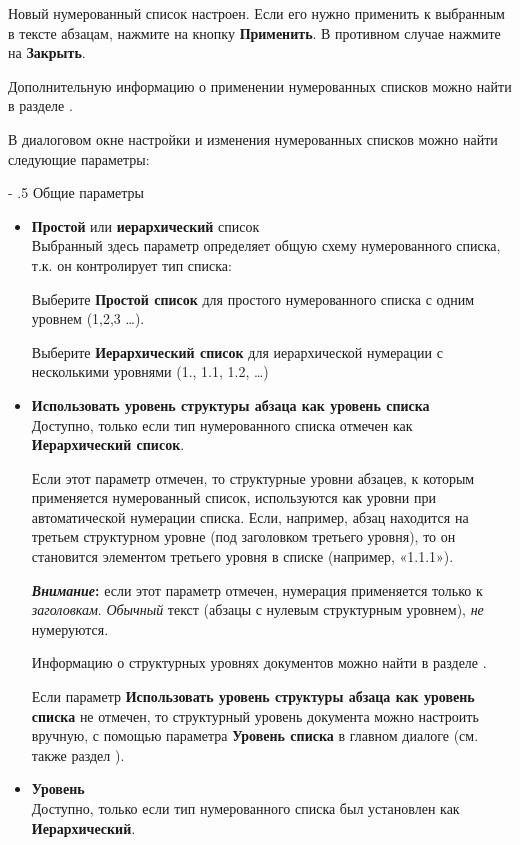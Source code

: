 ﻿\documentclass[a4paper,10pt]{article}
\makeatletter
\renewcommand\paragraph{%
   \@startsection{paragraph}{4}{0mm}%
      {-\baselineskip}%
      {.5\baselineskip}%
      {\normalfont\normalsize\bfseries}}
\makeatother
\begin{document}
Новый нумерованный список настроен. Если его нужно применить к выбранным в тексте абзацам, нажмите на кнопку \textbf{Применить}. В противном случае нажмите на \textbf{Закрыть}.

Дополнительную информацию о применении нумерованных списков можно найти в разделе .

В диалоговом окне настройки и изменения нумерованных списков можно найти следующие параметры:

\paragraph{Общие параметры}

\begin{itemize}
 \item \textbf{Простой} или \textbf{иерархический} список\\
 Выбранный здесь параметр определяет общую схему нумерованного списка, т.к. он контролирует тип списка:
 
 Выберите \textbf{Простой список} для простого нумерованного списка с одним уровнем (1,2,3 …).
 
 Выберите \textbf{Иерархический список} для иерархической нумерации с несколькими уровнями (1., 1.1, 1.2, …)
 \item \textbf{Использовать уровень структуры абзаца как уровень списка}\\
 Доступно, только если тип нумерованного списка отмечен как \textbf{Иерархический список}.
 
 Если этот параметр отмечен, то структурные уровни абзацев, к которым применяется нумерованный список, используются как уровни при автоматической нумерации списка. Если, например, абзац находится на третьем структурном уровне (под заголовком третьего уровня), то он становится элементом третьего уровня в списке (например, «1.1.1»).
 
 \begin{mdframed}[backgroundcolor=blue!10]
\textbf{\textit{Внимание}:} если этот параметр отмечен, нумерация применяется только к \textit{заголовкам}. \textit{Обычный} текст (абзацы с нулевым структурным уровнем), \textit{не} нумеруются.
\end{mdframed}

Информацию о структурных уровнях документов можно найти в разделе .

Если параметр \textbf{Использовать уровень структуры абзаца как уровень списка} не отмечен, то структурный уровень документа можно настроить вручную, с помощью параметра \textbf{Уровень списка} в главном диалоге (см. также раздел ).
\item \textbf{Уровень}\\
Доступно, только если тип нумерованного списка был установлен как \textbf{Иерархический}.


\end{itemize}
\end{document}
